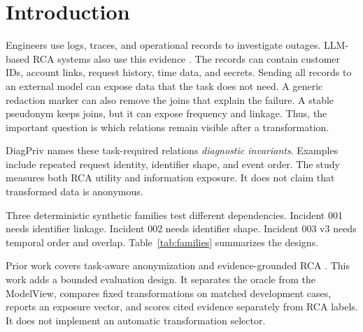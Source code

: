 \section{Introduction}
Engineers use logs, traces, and operational records to investigate outages.
LLM-based RCA systems also use this evidence
\cite{ahmed2023recommending,chen2024automatic,wang2024rcagent,xu2025openrca}.
The records can contain customer IDs, account links, request history, time
data, and secrets. Sending all records to an external model can expose data
that the task does not need. A generic redaction marker can also remove the
joins that explain the failure. A stable pseudonym keeps joins, but it can
expose frequency and linkage. Thus, the important question is which relations
remain visible after a transformation.

DiagPriv names these task-required relations \emph{diagnostic invariants}.
Examples include repeated request identity, identifier shape, and event order.
The study measures both RCA utility and information exposure. It does not
claim that transformed data is anonymous.

Three deterministic synthetic families test different dependencies.
Incident 001 needs identifier linkage. Incident 002 needs identifier shape.
Incident 003 v3 needs temporal order and overlap. Table~\ref{tab:families}
summarizes the designs.


Prior work covers task-aware anonymization and evidence-grounded RCA
\cite{loiseau2025taueval,loiseau2026adaptive,wang2026cloudopsbench}. This work
adds a bounded evaluation design. It separates the oracle from the ModelView,
compares fixed transformations on matched development cases, reports an
exposure vector, and scores cited evidence separately from RCA labels. It does
not implement an automatic transformation selector.
